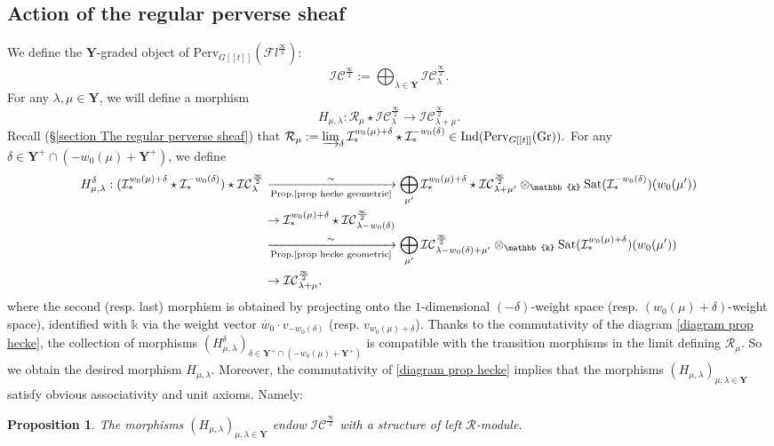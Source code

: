 \documentclass[11pt]{amsart}
\theoremstyle{plain}
\newtheorem{prop}[thm]{Proposition}
\theoremstyle{remark}
\numberwithin{equation}{section}
\begin{document}
 \subsection{Action of the regular perverse sheaf}\label{section Action of the regular perverse sheaf}
We define the $\mathbf{Y}$-graded object of $\mathrm{Perv}_{G[[t]]}(\mathcal{F}l^{\frac{\infty}{2}})$:
$$\mathcal{IC}^{\frac{\infty}{2}}:=\bigoplus_{\lambda\in\mathbf{Y}}\mathcal{IC}^{\frac{\infty}{2}}_\lambda.$$
For any $\lambda,\mu\in\mathbf{Y}$, we will define a morphism 
 $$H_{\mu,\lambda}:\mathcal{R}_{\mu}\star \mathcal{IC}^{\frac{\infty}{2}}_{\lambda}\to\mathcal{IC}^{\frac{\infty}{2}}_{\lambda+\mu}.  $$
 Recall (§\ref{section The regular perverse sheaf}) that $\mathcal{R}_\mu:=\varinjlim_{\delta}  \mathcal{I}^{w_0(\mu)+\delta}_*\star\mathcal{I}^{-w_0(\delta)}_*\in\mathrm{Ind}(\mathrm{Perv}_{G[[t]]}(\mathrm{Gr})).$ For any $\delta\in \mathbf{Y}^+\cap(-w_0(\mu)+\mathbf{Y}^+)$, we define
 \begin{align*}
     H_{\mu,\lambda}^\delta:(\mathcal{I}^{w_0(\mu)+\delta}_*\star\mathcal{I}^{-w_0(\delta)}_*)\star\mathcal{IC}^{\frac{\infty}{2}}_\lambda&\xrightarrow[\text{Prop.\ref{prop hecke geometric}}]{\sim}\bigoplus_{\mu'}\mathcal{I}^{w_0(\mu)+\delta}_*\star\mathcal{IC}^{\frac{\infty}{2}}_{\lambda+\mu'}\otimes_\mathbb{k}\mathrm{Sat}(\mathcal{I}^{-w_0(\delta)}_*)(w_0(\mu')) \\
     &\to\mathcal{I}^{w_0(\mu)+\delta}_*\star\mathcal{IC}^{\frac{\infty}{2}}_{\lambda-w_0(\delta)} \\
     &\xrightarrow[\text{Prop.\ref{prop hecke geometric}}]{\sim}\bigoplus_{\mu'}\mathcal{IC}^{\frac{\infty}{2}}_{\lambda-w_0(\delta)+\mu'}\otimes_\mathbb{k}\mathrm{Sat}(\mathcal{I}^{w_0(\mu)+\delta}_*)(w_0(\mu'))\\
     &\to\mathcal{IC}^{\frac{\infty}{2}}_{\lambda+\mu},
 \end{align*}
 where the second (resp. last) morphism is obtained by projecting onto the $1$-dimensional $(-\delta)$-weight space (resp. $(w_0(\mu)+\delta)$-weight space), identified with $\mathbb{k}$ via the weight vector $\dot{w_0}\cdot v_{-w_0(\delta)}$ (resp. $v_{w_0(\mu)+\delta}$). Thanks to the commutativity of the diagram \eqref{diagram prop hecke}, the collection of morphisms $(H_{\mu,\lambda}^\delta)_{\delta\in \mathbf{Y}^+\cap(-w_0(\mu)+\mathbf{Y}^+)}$ is compatible with the transition morphisms in the limit defining $\mathcal{R}_\mu$. So we obtain the desired morphism $H_{\mu,\lambda}$. Moreover, the commutativity of  \eqref{diagram prop hecke} implies that the morphisms $(H_{\mu,\lambda})_{\mu,\lambda\in\mathbf{Y}}$ satisfy obvious associativity and unit axioms. Namely:
 \begin{prop}\label{prop action IC}
    The morphisms $(H_{\mu,\lambda})_{\mu,\lambda\in\mathbf{Y}}$ endow $\mathcal{IC}^{\frac{\infty}{2}}$ with a structure of left $\mathcal{R}$-module.
\end{prop}
 
\end{document}
